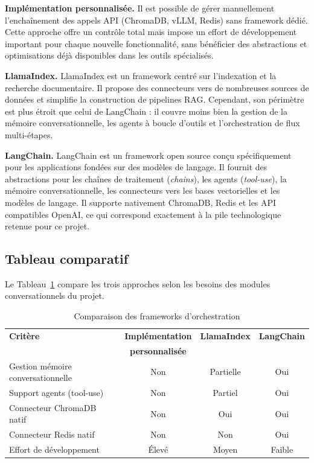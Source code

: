 \textbf{Implémentation personnalisée.}
Il est possible de gérer manuellement l'enchaînement des appels API
(ChromaDB, vLLM, Redis) sans framework dédié.
Cette approche offre un contrôle total mais impose un effort de développement
important pour chaque nouvelle fonctionnalité, sans bénéficier des abstractions
et optimisations déjà disponibles dans les outils spécialisés.

\textbf{LlamaIndex.}
LlamaIndex est un framework centré sur l'indexation et la recherche documentaire.
Il propose des connecteurs vers de nombreuses sources de données
et simplifie la construction de pipelines RAG.
Cependant, son périmètre est plus étroit que celui de LangChain :
il couvre moins bien la gestion de la mémoire conversationnelle,
les agents à boucle d'outils et l'orchestration de flux multi-étapes.

\textbf{LangChain.}
LangChain \cite{langchain} est un framework open source conçu spécifiquement
pour les applications fondées sur des modèles de langage.
Il fournit des abstractions pour les chaînes de traitement (\textit{chains}),
les agents (\textit{tool-use}), la mémoire conversationnelle, les connecteurs
vers les bases vectorielles et les modèles de langage.
Il supporte nativement ChromaDB, Redis et les API compatibles OpenAI,
ce qui correspond exactement à la pile technologique retenue pour ce projet.

\subsection{Tableau comparatif}

Le Tableau~\ref{tab:comparatif_orchestration} compare les trois approches
selon les besoins des modules conversationnels du projet.

\vspace{6pt}
\begin{table}[H]
\centering
\caption{Comparaison des frameworks d'orchestration}
\label{tab:comparatif_orchestration}
\begin{tabular}{|l|c|c|c|}
\hline
\textbf{Critère} & \textbf{Implémentation} & \textbf{LlamaIndex} & \textbf{LangChain} \\
                 & \textbf{personnalisée}  &                     &                    \\
\hline
Gestion mémoire conversationnelle & Non & Partielle & Oui \\
Support agents (tool-use)         & Non & Partiel   & Oui \\
Connecteur ChromaDB natif         & Non & Oui       & Oui \\
Connecteur Redis natif            & Non & Non       & Oui \\
Effort de développement           & Élevé & Moyen   & Faible \\
\hline
\end{tabular}
\end{table}

